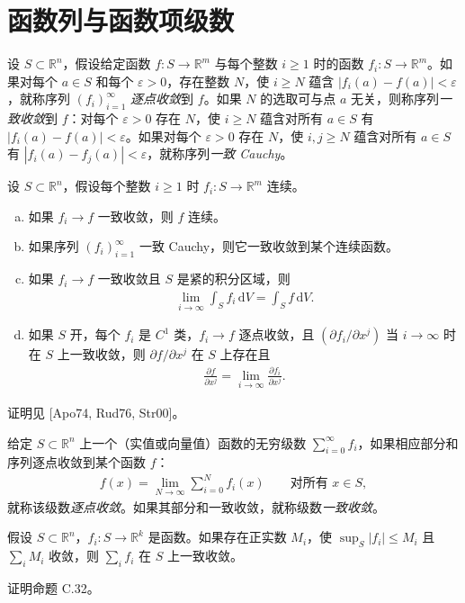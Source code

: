 \documentclass[../../main.tex]{subfiles}
\begin{document}
\section{函数列与函数项级数}\label{section:appC-sequences-and-series}

设 $S\subset\mathbb R^n$，假设给定函数 $f:S\to\mathbb R^m$ 与每个整数 $i\geqslant1$ 时的函数 $f_i:S\to\mathbb R^m$。如果对每个 $a\in S$ 和每个 $\varepsilon>0$，存在整数 $N$，使 $i\geqslant N$ 蕴含 $|f_i(a)-f(a)|<\varepsilon$，就称序列 $(f_i)_{i=1}^\infty$ \emph{逐点收敛}到 $f$。如果 $N$ 的选取可与点 $a$ 无关，则称序列\emph{一致收敛}到 $f$：对每个 $\varepsilon>0$ 存在 $N$，使 $i\geqslant N$ 蕴含对所有 $a\in S$ 有 $|f_i(a)-f(a)|<\varepsilon$。如果对每个 $\varepsilon>0$ 存在 $N$，使 $i,j\geqslant N$ 蕴含对所有 $a\in S$ 有 $|f_i(a)-f_j(a)|<\varepsilon$，就称序列\emph{一致 Cauchy}。

\begin{theorem}[一致收敛的性质]\label{theorem:appC-uniform-convergence}
设 $S\subset\mathbb R^n$，假设每个整数 $i\geqslant1$ 时 $f_i:S\to\mathbb R^m$ 连续。
\begin{enumerate}[(a)]
\item 如果 $f_i\to f$ 一致收敛，则 $f$ 连续。
\item 如果序列 $(f_i)_{i=1}^\infty$ 一致 Cauchy，则它一致收敛到某个连续函数。
\item 如果 $f_i\to f$ 一致收敛且 $S$ 是紧的积分区域，则
\begin{align*}
\lim_{i\to\infty}\int_S f_i\,\mathrm{d}V=\int_S f\,\mathrm{d}V.
\end{align*}
\item 如果 $S$ 开，每个 $f_i$ 是 $C^1$ 类，$f_i\to f$ 逐点收敛，且 $(\partial f_i/\partial x^j)$ 当 $i\to\infty$ 时在 $S$ 上一致收敛，则 $\partial f/\partial x^j$ 在 $S$ 上存在且
\begin{align*}
\frac{\partial f}{\partial x^j}=\lim_{i\to\infty}\frac{\partial f_i}{\partial x^j}.
\end{align*}
\end{enumerate}
\end{theorem}

证明见 [Apo74, Rud76, Str00]。

给定 $S\subset\mathbb R^n$ 上一个（实值或向量值）函数的无穷级数 $\sum_{i=0}^\infty f_i$，如果相应部分和序列逐点收敛到某个函数 $f$：
\begin{align*}
f(x)=\lim_{N\to\infty}\sum_{i=0}^N f_i(x)\qquad\text{对所有 }x\in S,
\end{align*}
就称该级数\emph{逐点收敛}。如果其部分和一致收敛，就称级数\emph{一致收敛}。

\begin{proposition}\label{proposition:appC-weierstrass-m}
假设 $S\subset\mathbb R^n$，$f_i:S\to\mathbb R^k$ 是函数。如果存在正实数 $M_i$，使 $\sup_S|f_i|\leqslant M_i$ 且 $\sum_i M_i$ 收敛，则 $\sum_i f_i$ 在 $S$ 上一致收敛。
\end{proposition}

\begin{exercise}\label{exercise:appC-C-33}
证明命题 C.32。
\end{exercise}
\end{document}
